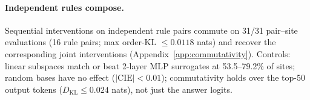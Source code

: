 \paragraph{Independent rules compose.} Sequential interventions on
independent rule pairs commute on 31/31 pair--site evaluations (16 rule
pairs; max order-KL $\le 0.0118$ nats) and recover the corresponding joint
interventions (Appendix~\ref{app:commutativity}). Controls: linear
subspaces match or beat 2-layer MLP surrogates at 53.5--79.2\% of sites;
random bases have no effect ($|\mathrm{CIE}|<0.01$); commutativity holds
over the top-50 output tokens ($D_{\mathrm{KL}} \le 0.024$ nats), not just
the answer logits.
